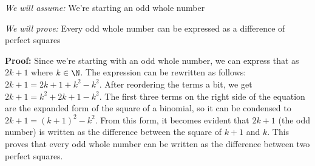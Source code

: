 	\textit{We will assume:} We're starting an odd whole number

	\textit{We will prove:} Every odd whole number can be expressed as a difference of perfect squares \spacing

	\textbf{Proof:} Since we're starting with an odd whole number, we can express 
	that as $2k + 1$ where $k \in \N$. The expression can be rewritten as follows:
	$2k + 1 = 2k + 1 + k^2 - k^2$. After reordering the terms a bit, we get
	$2k + 1 = k^2 + 2k + 1 - k^2$. The first three terms on the right side 
	of the equation are the expanded form of the square of a binomial, so it can 
	be condensed to $2k + 1 = (k + 1)^2 - k^2$. From this form, it becomes evident
	that $2k + 1$ (the odd number) is written as the difference between the square 
	of $k + 1$ and $k$. This proves that every odd whole number can be written as the 
	difference between two perfect squares.

	\proofEnd
